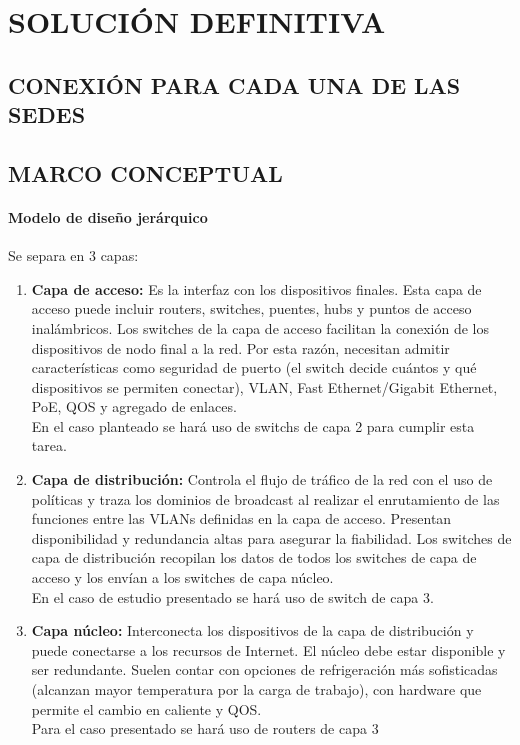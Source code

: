\chapter{SOLUCI\'ON DEFINITIVA}

\section{CONEXI\'ON PARA CADA UNA DE LAS SEDES}
\section{MARCO CONCEPTUAL}
\subsubsection{ Modelo de dise\~no jer\'arquico}
Se separa en 3 capas:
\begin{definicion}[]
{
\begin{enumerate}[label=\itembolasazules{}]
\item \textbf{Capa de acceso:} Es la interfaz con los dispositivos finales. Esta capa de acceso puede incluir routers, switches, puentes, hubs y puntos de acceso inal\'ambricos. Los switches de la capa de acceso facilitan la conexi\'on de los dispositivos de nodo final a la red. Por esta raz\'on, necesitan admitir caracter\'isticas como seguridad de puerto (el switch decide cu\'antos y qu\'e dispositivos se permiten conectar), VLAN, Fast Ethernet/Gigabit Ethernet, PoE, QOS y agregado de enlaces.
\\
En el caso planteado se har\'a uso de switchs de capa 2 para cumplir esta tarea.
\item\textbf{ Capa de distribuci\'on: } Controla el flujo de tr\'afico de la red con el uso de pol\'iticas y traza los dominios de broadcast al realizar el enrutamiento de las funciones entre las VLANs definidas en la capa de acceso. Presentan disponibilidad y redundancia altas para asegurar la fiabilidad. Los switches de capa de distribuci\'on recopilan los datos de todos los switches de capa de acceso y los env\'ian a los switches de capa n\'ucleo. 
\\
En el caso de estudio presentado se har\'a uso de switch de capa 3.
\item \textbf{Capa n\'ucleo:} Interconecta los dispositivos de la capa de distribuci\'on y puede conectarse a los recursos de Internet. El n\'ucleo debe estar disponible y ser redundante. Suelen contar con opciones de refrigeraci\'on m\'as sofisticadas (alcanzan mayor temperatura por la carga de trabajo), con hardware que permite el cambio en caliente y QOS.
\\
Para el caso presentado se har\'a uso de routers de capa 3
\end{enumerate}
}
\end{definicion}

